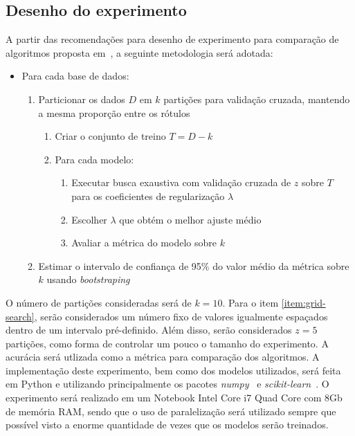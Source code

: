 \documentclass[conference]{IEEEtran}
\begin{document}
	\subsection{Desenho do experimento}
	A partir das recomendações para desenho de experimento para comparação de algoritmos proposta em~\cite{salzberg1997comparing}, a seguinte metodologia será adotada:
	\begin{itemize}
		\item Para cada base de dados:
		\begin{enumerate}
			\item Particionar os dados $D$ em $k$ partições para validação cruzada, mantendo a mesma proporção entre os rótulos
			\begin{enumerate}
				\item Criar o conjunto de treino $T = D - k$
				\item Para cada modelo:
				\begin{enumerate}
					\item Executar busca exaustiva com validação cruzada de $z$ sobre $T$ para os coeficientes de regularização $\lambda$ \label{item:grid-search}
					\item Escolher $\lambda$ que obtém o melhor ajuste médio 
					\item Avaliar a métrica do modelo sobre $k$
				\end{enumerate}
			\end{enumerate}
			\item Estimar o intervalo de confiança de 95\% do valor médio da métrica sobre $k$ usando \textit{bootstraping}
		\end{enumerate}
	\end{itemize}
	
	O número de partições consideradas será de $k=10$. Para o item \ref{item:grid-search}, serão considerados um número fixo de valores igualmente espaçados dentro de um intervalo pré-definido. Além disso, serão considerados $z=5$ partições, como forma de controlar um pouco o tamanho do experimento. A acurácia será utlizada como a métrica para comparação dos algoritmos. A implementação deste experimento, bem como dos modelos utilizados, será feita em Python e utilizando principalmente os pacotes \textit{numpy}~\cite{harris2020array} e \textit{scikit-learn}~\cite{scikit-learn}. O experimento será realizado em um Notebook Intel Core i7 Quad Core com 8Gb de memória RAM, sendo que o uso de paralelização será utilizado sempre que possível visto a enorme quantidade de vezes que os modelos serão treinados.
	
\end{document}
